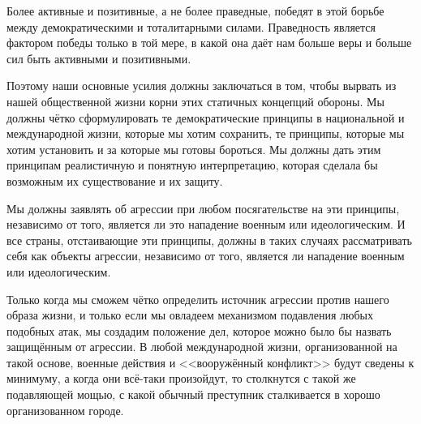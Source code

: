 Более активные и позитивные, а не более праведные, победят в этой борьбе между демократическими и тоталитарными силами. Праведность является фактором победы только в той мере, в какой она даёт нам больше веры и больше сил быть активными и позитивными.

Поэтому наши основные усилия должны заключаться в том, чтобы вырвать из нашей общественной жизни корни этих статичных концепций обороны. Мы должны чётко сформулировать те демократические принципы в национальной и международной жизни, которые мы хотим сохранить, те принципы, которые мы хотим установить и за которые мы готовы бороться. Мы должны дать этим принципам реалистичную и понятную интерпретацию, которая сделала бы возможным их существование и их защиту.
 
Мы должны заявлять об агрессии при любом посягательстве на эти принципы, независимо от того, является ли это нападение военным или идеологическим. И все страны, отстаивающие эти принципы, должны в таких случаях рассматривать себя как объекты агрессии, независимо от того, является ли нападение военным или идеологическим.

Только когда мы сможем чётко определить источник агрессии против нашего образа жизни, и только если мы овладеем механизмом подавления любых подобных атак, мы создадим положение дел, которое можно было бы назвать защищённым от агрессии. В любой международной жизни, организованной на такой основе, военные действия и <<вооружённый конфликт>> будут сведены к минимуму, а когда они всё-таки произойдут, то столкнутся с такой же подавляющей мощью, с какой обычный преступник сталкивается в хорошо организованном городе.
